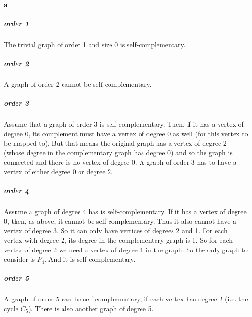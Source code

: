 \paragraph{a}
\subparagraph{order 1}
The trivial graph of order 1 and size 0 is self-complementary.
\subparagraph{order 2}
A graph of order 2 cannot be self-complementary.
\subparagraph{order 3}
Assume that a graph of order 3 is self-complementary. Then, if it has a vertex of degree 0, its complement must have a vertex of degree 0 as well (for this vertex to be mapped to). But that means the original graph has a vertex of degree 2 (whose degree in the complementary graph has degree 0) and so the graph is connected and there is no vertex of degree 0. A graph of order 3 has to have a vertex of either degree 0 or degree 2.
\subparagraph{order 4}
Assume a graph of degree 4 has is self-complementary. If it has a vertex of degree 0, then, as above, it cannot be self-complementary. Thus it also cannot have a vertex of degree 3. So it can only have vertices of degrees 2 and 1. For each vertex with degree 2, its degree in the complementary graph is 1. So for each vertex of degree 2 we need a vertex of degree 1 in the graph. So the only graph to consider is $P_4$. And it is self-complementary.
\subparagraph{order 5}
A graph of order 5 can be self-complementary, if each vertex has degree 2 (i.e. the cycle $C_5$). There is also another graph of degree 5.
